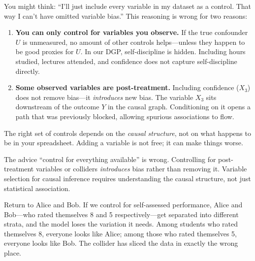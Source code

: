 \documentclass[11pt,a4paper]{article}
\theoremstyle{definition}
\theoremstyle{plain}
\theoremstyle{remark}
\begin{document}
\begin{keyinsight}
You might think: ``I'll just include every variable in my dataset as a control. That way I can't have omitted variable bias.'' This reasoning is wrong for two reasons:
\begin{enumerate}
  \item \textbf{You can only control for variables you observe.} If the true confounder $U$ is unmeasured, no amount of other controls helps---unless they happen to be good proxies for $U$. In our DGP, self-discipline is hidden. Including hours studied, lectures attended, and confidence does not capture self-discipline directly.
  \item \textbf{Some observed variables are post-treatment.} Including confidence ($X_3$) does not remove bias---it \emph{introduces} new bias. The variable $X_3$ sits downstream of the outcome $Y$ in the causal graph. Conditioning on it opens a path that was previously blocked, allowing spurious associations to flow.
\end{enumerate}
The right set of controls depends on the \emph{causal structure}, not on what happens to be in your spreadsheet. Adding a variable is not free; it can make things worse.
\end{keyinsight}

\begin{warningbox}
The advice ``control for everything available'' is wrong.
Controlling for post-treatment variables or colliders \emph{introduces} bias rather than removing it.
Variable selection for causal inference requires understanding the causal structure, not just statistical association.
\end{warningbox}

Return to Alice and Bob. If we control for self-assessed performance, Alice and Bob---who rated themselves 8 and 5 respectively---get separated into different strata, and the model loses the variation it needs. Among students who rated themselves 8, everyone looks like Alice; among those who rated themselves 5, everyone looks like Bob. The collider has sliced the data in exactly the wrong place.
\end{document}
